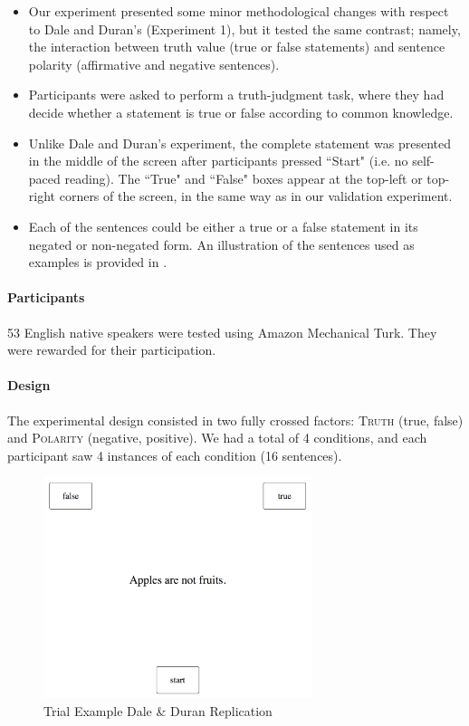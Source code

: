 \documentclass{article}
\begin{document}
\begin{itemize}

\item Our experiment presented some minor methodological changes with respect to Dale and Duran's (Experiment 1), but it tested the same contrast; namely, the interaction between truth value (true or false statements) and sentence polarity (affirmative and negative sentences). 

\item Participants were asked to perform a truth-judgment task, where they had decide whether a statement is true or false according to common knowledge. 

\item Unlike Dale and Duran's experiment, the complete statement was presented in the middle of the screen after participants pressed ``Start" (i.e. no self-paced reading). The ``True" and ``False"  boxes appear at the top-left or top-right corners of the screen, in the same way as in our validation experiment.  

\item Each of the sentences could be either a true or a false statement in its negated or non-negated form. 
An illustration of the sentences used as examples is provided in . 


\end{itemize}

\paragraph{Participants}
53 English native speakers were tested using Amazon Mechanical Turk. They were rewarded for their participation.  

\paragraph{Design}
The experimental design consisted in two fully crossed factors: \textsc{Truth} (true, false) and \textsc{Polarity} (negative, positive). We had a total of 4 conditions, and each participant saw 4 instances of each condition (16 sentences). 


\begin{figure}
\centering
\includegraphics[width=0.7\textwidth]{trial_example2.png}
\caption{Trial Example Dale \& Duran Replication}
\end{figure}
\end{document}
